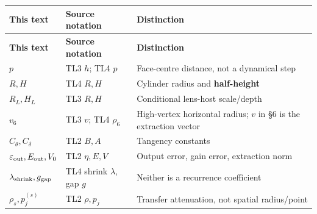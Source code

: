 \documentclass[11pt,a4paper]{article}
\begin{document}
\begingroup\small\setlength{\LTpre}{5pt}\setlength{\LTpost}{7pt}
\begin{longtable}{@{}>{\raggedright\arraybackslash}p{0.2500\dimexpr\textwidth-24pt\relax}>{\raggedright\arraybackslash}p{0.3700\dimexpr\textwidth-24pt\relax}>{\raggedright\arraybackslash}p{0.3800\dimexpr\textwidth-24pt\relax}@{}}
\toprule
\textbf{This text} & \textbf{Source notation} & \textbf{Distinction}\\ \midrule
\endfirsthead
\textbf{This text} & \textbf{Source notation} & \textbf{Distinction}\\ \midrule
\endhead
\bottomrule\endfoot
\(p\) & TL3 \(h\); TL4 \(p\) & Face-centre distance, not a dynamical step\\[4pt]
\(R,H\) & TL4 \(R,H\) & Cylinder radius and \textbf{half-height}\\[4pt]
\(R_L,H_L\) & TL3 \(R,H\) & Conditional lens-host scale/\allowbreak{}depth\\[4pt]
\(v_6\) & TL3 \(v\); TL4 \(\rho_6\) & High-vertex horizontal radius; \(v\) in \S{}6 is the extraction vector\\[4pt]
\(C_\theta,C_\delta\) & TL2 \(B,A\) & Tangency constants\\[4pt]
\(\varepsilon_{\rm out},E_{\rm out},V_0\) & TL2 \(\eta,E,V\) & Output error, gain error, extraction norm\\[4pt]
\(\lambda_{\rm shrink},g_{\rm gap}\) & TL4 shrink \(\lambda\), gap \(g\) & Neither is a recurrence coefficient\\[4pt]
\(\rho_s,p_j^{(s)}\) & TL2 \(\rho,p_j\) & Transfer attenuation, not spatial radius/\allowbreak{}point\\[4pt]
\end{longtable}\endgroup
\end{document}
